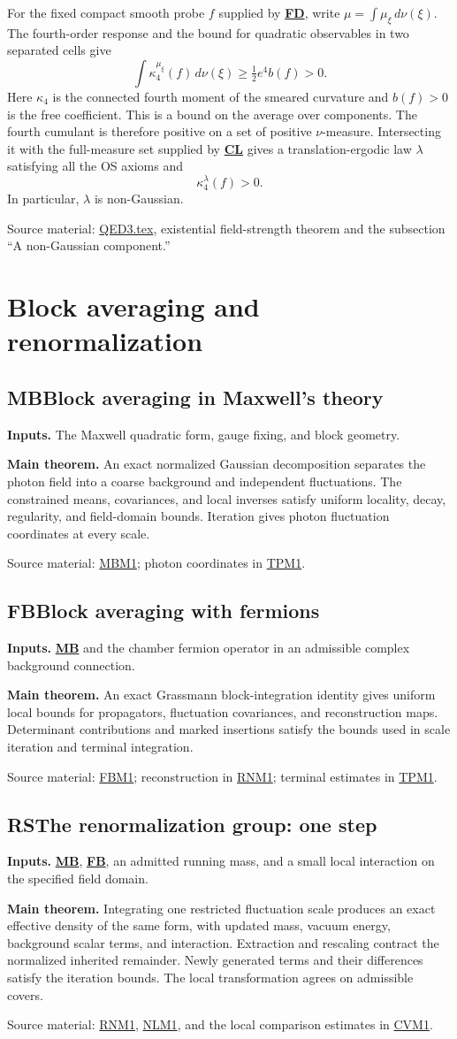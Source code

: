 \documentclass[11pt]{article}
\newcommand{\Code}[1]{\hyperlink{block-#1}{\textbf{#1}}}
\newcommand{\Block}[2]{\hypertarget{block-#1}{}%
 \subsection*{\textcolor{flowgreen}{#1}\quad #2}}
\newcommand{\Inputs}[1]{\textbf{Inputs.} #1\par}
\newcommand{\Theorem}[1]{\textbf{Main theorem.} #1\par}
\newcommand{\Sources}[1]{\par{\small\textcolor{flowgray}{Source material:} #1\par}}
\newcommand{\Repo}{https://github.com/ethanwsussman/Yang--Mills-LLM-experiment}
\newcommand{\Old}[2]{\href{\Repo/#1}{#2}}
\newcommand{\MBsource}{\Old{tree/main/QED3/OLD/Submanuscripts/Maxwell\%20block\%20analysis\%20\%28MB1\%29}{MBM1}}
\newcommand{\FBsource}{\Old{tree/main/QED3/OLD/Submanuscripts/Chamber\%20fermion\%20block\%20analysis\%20\%28FB1\%29}{FBM1}}
\newcommand{\RNsource}{\Old{tree/main/QED3/OLD/Submanuscripts/Relevant\%20extraction\%20and\%20normalized\%20contraction\%20\%28RN1\%29}{RNM1}}
\newcommand{\NLsource}{\Old{tree/main/QED3/OLD/Submanuscripts/Nonlinear\%20renormalization\%20step\%20\%28NL1\%29}{NLM1}}
\newcommand{\CVsource}{\Old{tree/main/QED3/OLD/Submanuscripts/Cover\%20agreement\%20and\%20common\%20tuning\%20\%28CV1\%29}{CVM1}}
\newcommand{\TPsource}{\Old{tree/main/QED3/OLD/Submanuscripts/Terminal\%20measure\%20and\%20pressure\%20\%28TP1\%29}{TPM1}}
\newcommand{\CurrentQEsource}{\Old{blob/main/QED3/QED3.tex}{QED3.tex}}
\begin{document}
For the fixed compact smooth probe \(f\) supplied by \Code{FD}, write
\(\mu=\int\mu_\xi\,d\nu(\xi)\). The fourth-order response and the
bound for quadratic observables in two separated cells give
\[
 \int\kappa_4^{\mu_\xi}(f)\,d\nu(\xi)
 \ge \tfrac12e^4b(f)>0.
\]
Here \(\kappa_4\) is the connected fourth moment of the smeared
curvature and \(b(f)>0\) is the free coefficient. This is a bound
on the average over components. The fourth cumulant is therefore
positive on a set of positive \(\nu\)-measure. Intersecting it with the
full-measure set supplied by \Code{CL} gives a translation-ergodic
law \(\lambda\) satisfying all the OS axioms and
\[
 \kappa_4^\lambda(f)>0.
\]
In particular, \(\lambda\) is non-Gaussian.
\Sources{\CurrentQEsource, existential field-strength theorem and the
subsection ``A non-Gaussian component.''}


\clearpage
\section*{Block averaging and renormalization}

\Block{MB}{Block averaging in Maxwell's theory}
\Inputs{The Maxwell quadratic form, gauge fixing, and block geometry.}
\Theorem{An exact normalized Gaussian decomposition separates the photon
field into a coarse background and independent fluctuations. The
constrained means, covariances, and local inverses satisfy uniform
locality, decay, regularity, and field-domain bounds. Iteration gives
photon fluctuation coordinates at every scale.}
\Sources{\MBsource; photon coordinates in \TPsource.}

\Block{FB}{Block averaging with fermions}
\Inputs{\Code{MB} and the chamber fermion operator in an admissible
complex background connection.}
\Theorem{An exact Grassmann block-integration identity gives uniform
local bounds for propagators, fluctuation covariances, and reconstruction
maps. Determinant contributions and marked insertions satisfy the bounds
used in scale iteration and terminal integration.}
\Sources{\FBsource; reconstruction in \RNsource; terminal estimates in \TPsource.}

\Block{RS}{The renormalization group: one step}
\Inputs{\Code{MB}, \Code{FB}, an admitted running mass, and a small local
interaction on the specified field domain.}
\Theorem{Integrating one restricted fluctuation scale produces an exact
effective density of the same form, with updated mass, vacuum energy,
background scalar terms, and interaction. Extraction and rescaling
contract the normalized inherited remainder. Newly generated terms and
their differences satisfy the iteration bounds.
The local transformation agrees on admissible covers.}
\Sources{\RNsource, \NLsource, and the local comparison estimates in \CVsource.}
\end{document}
